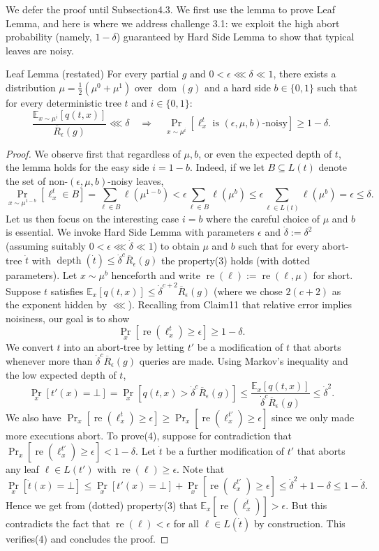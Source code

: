 We defer the proof until Subsection4.3. We first use the lemma to prove Leaf Lemma, and here is where we address challenge 3.1: we exploit the high abort probability (namely, $1-\delta$) guaranteed by Hard Side Lemma to show that typical leaves are noisy.
\begin{authorclaim}{Leaf Lemma (restated)}
For every partial $g$ and $0<\epsilon\lll\delta\ll1$, there exists a distribution $\mu=\frac12(\mu^0+\mu^1)$ over $\operatorname{dom}(g)$ and a hard side $b\in\{0,1\}$ such that for every deterministic tree $t$ and $i\in\{0,1\}$:
\[\frac{\mathbb E_{x\sim\mu^i}[q(t,x)]}{\overline R_\epsilon(g)}\lll\delta\quad\Longrightarrow\quad\Pr_{x\sim\mu^i}[\ell_x^t\text{ is }(\epsilon,\mu,b)\text{-noisy}]\ge1-\delta.\]
\end{authorclaim}
\begin{proof}
We observe first that regardless of $\mu,b$, or even the expected depth of $t$, the lemma holds for the easy side $i=1-b$. Indeed, if we let $B\subseteq L(t)$ denote the set of non-$(\epsilon,\mu,b)$-noisy leaves,
\[\Pr_{x\sim\mu^{1-b}}[\ell_x^t\in B]=\sum_{\ell\in B}\ell(\mu^{1-b})<\epsilon\sum_{\ell\in B}\ell(\mu^b)\le\epsilon\sum_{\ell\in L(t)}\ell(\mu^b)=\epsilon\le\delta.\]
Let us then focus on the interesting case $i=b$ where the careful choice of $\mu$ and $b$ is essential. We invoke Hard Side Lemma with parameters $\epsilon$ and $\dot\delta:=\delta^2$ (assuming suitably $0<\epsilon\lll\dot\delta\ll1$) to obtain $\mu$ and $b$ such that for every abort-tree $\dot t$ with $\operatorname{depth}(\dot t)\le\dot\delta^c\overline R_\epsilon(g)$ the property(3) holds (with dotted parameters). Let $x\sim\mu^b$ henceforth and write $\operatorname{re}(\ell):=\operatorname{re}(\ell,\mu)$ for short. Suppose $t$ satisfies $\mathbb E_x[q(t,x)]\le\dot\delta^{c+2}\overline R_\epsilon(g)$ (where we chose $2(c+2)$ as the exponent hidden by $\lll$). Recalling from Claim11 that relative error implies noisiness, our goal is to show
\begin{equation}\tag{4}\Pr_x[\operatorname{re}(\ell_x^t)\ge\epsilon]\ge1-\delta.\end{equation}
We convert $t$ into an abort-tree by letting $t'$ be a modification of $t$ that aborts whenever more than $\dot\delta^c\overline R_\epsilon(g)$ queries are made. Using Markov's inequality and the low expected depth of $t$,
\[\Pr_x[t'(x)=\bot]=\Pr_x[q(t,x)>\dot\delta^c\overline R_\epsilon(g)]\le\frac{\mathbb E_x[q(t,x)]}{\dot\delta^c\overline R_\epsilon(g)}\le\dot\delta^2.\]
We also have $\Pr_x[\operatorname{re}(\ell_x^t)\ge\epsilon]\ge\Pr_x[\operatorname{re}(\ell_x^{t'})\ge\epsilon]$ since we only made more executions abort. To prove(4), suppose for contradiction that $\Pr_x[\operatorname{re}(\ell_x^{t'})\ge\epsilon]<1-\delta$. Let $\dot t$ be a further modification of $t'$ that aborts any leaf $\ell\in L(t')$ with $\operatorname{re}(\ell)\ge\epsilon$. Note that
\[\Pr_x[\dot t(x)=\bot]\le\Pr_x[t'(x)=\bot]+\Pr_x[\operatorname{re}(\ell_x^{t'})\ge\epsilon]\le\dot\delta^2+1-\delta\le1-\dot\delta.\]
Hence we get from (dotted) property(3) that $\mathbb E_x[\operatorname{re}(\ell_x^{\dot t})]>\epsilon$. But this contradicts the fact that $\operatorname{re}(\ell)<\epsilon$ for all $\ell\in L(\dot t)$ by construction. This verifies(4) and concludes the proof.
\end{proof}
